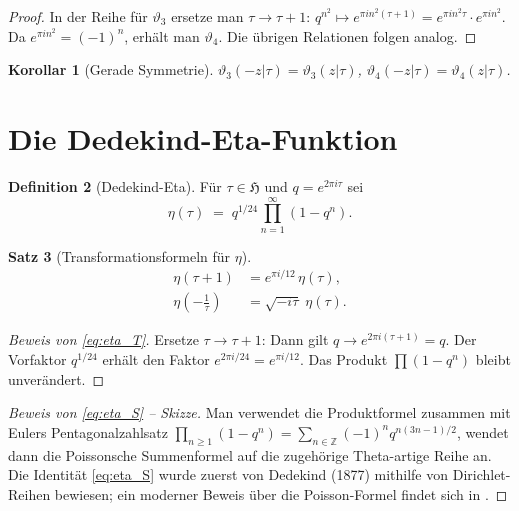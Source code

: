 \documentclass[12pt,a4paper]{amsart}
\newtheorem{theorem}{Satz}[section]
\newtheorem{corollary}[theorem]{Korollar}
\theoremstyle{definition}
\newtheorem{definition}[theorem]{Definition}
\begin{document}
\begin{proof}
In der Reihe für $\vartheta_3$ ersetze man $\tau \to \tau+1$:
$q^{n^2} \mapsto e^{\pi i n^2(\tau+1)} = e^{\pi i n^2 \tau} \cdot e^{\pi i n^2}$.
Da $e^{\pi i n^2} = (-1)^n$, erhält man $\vartheta_4$.
Die übrigen Relationen folgen analog.
\end{proof}

\begin{corollary}[Gerade Symmetrie]\label{cor:even}
$\vartheta_3(-z|\tau) = \vartheta_3(z|\tau)$, \quad
$\vartheta_4(-z|\tau) = \vartheta_4(z|\tau)$.
\end{corollary}

\section{Die Dedekind-Eta-Funktion}\label{sec:eta}

\begin{definition}[Dedekind-Eta]\label{def:eta}
Für $\tau \in \mathfrak{H}$ und $q = e^{2\pi i\tau}$ sei
\[
  \eta(\tau) \;=\; q^{1/24}\prod_{n=1}^{\infty}(1-q^n).
\]
\end{definition}

\begin{theorem}[Transformationsformeln für $\eta$]\label{thm:eta_transform}
\begin{align}
  \eta(\tau+1) &= e^{\pi i/12}\,\eta(\tau),\label{eq:eta_T}\\
  \eta\!\left(-\tfrac{1}{\tau}\right) &= \sqrt{-i\tau}\;\eta(\tau).\label{eq:eta_S}
\end{align}
\end{theorem}

\begin{proof}[Beweis von \eqref{eq:eta_T}]
Ersetze $\tau \to \tau+1$: Dann gilt $q \to e^{2\pi i(\tau+1)} = q$.
Der Vorfaktor $q^{1/24}$ erhält den Faktor $e^{2\pi i/24} = e^{\pi i/12}$.
Das Produkt $\prod(1-q^n)$ bleibt unverändert.
\end{proof}

\begin{proof}[Beweis von \eqref{eq:eta_S} -- Skizze]
Man verwendet die Produktformel zusammen mit Eulers Pentagonalzahlsatz
$\prod_{n\geq1}(1-q^n) = \sum_{n\in\mathbb{Z}}(-1)^n q^{n(3n-1)/2}$,
wendet dann die Poissonsche Summenformel auf die zugehörige Theta-artige Reihe an.
Die Identität \eqref{eq:eta_S} wurde zuerst von Dedekind (1877) mithilfe von
Dirichlet-Reihen bewiesen; ein moderner Beweis über die Poisson-Formel findet sich
in \cite{Apostol1990}.
\end{proof}
\end{document}
